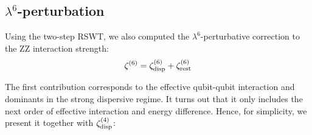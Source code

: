 \documentclass[%
 reprint,
 amsmath,amssymb,
 aps,
pra,
noeprint,
superscriptaddress,
]{revtex4-2}
\begin{document}
\subsection{$\lambda^6$-perturbation}

Using the two-step RSWT, we also computed the $\lambda^6$-perturbative correction to the ZZ interaction strength:
\begin{equation}
    \zeta^{(6)} = \zeta^{(6)}_{\textnormal{disp}} + \zeta^{(6)}_{\textnormal{rest}}
\end{equation}

The first contribution corresponds to the effective qubit-qubit interaction and dominants in the strong dispersive regime.
It turns out that it only includes the next order of effective interaction and energy difference.
Hence, for simplicity, we present it together with $\zeta^{(4)}_{\textnormal{disp}}$:
\end{document}
